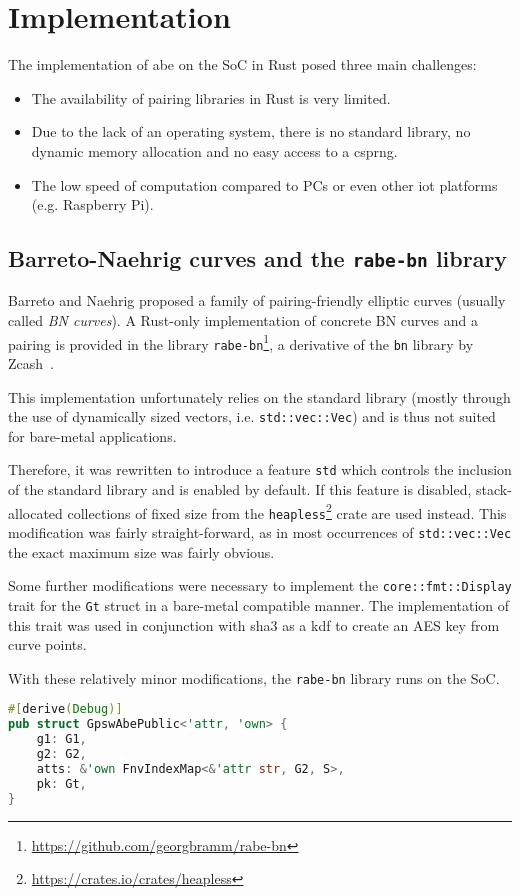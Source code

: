 \chapter{Implementation}

The implementation of \acrshort{abe} on the SoC in Rust posed three main challenges:
\begin{itemize}
    \item The availability of pairing libraries in Rust is very limited.
    \item Due to the lack of an operating system, there is no standard library, no dynamic memory allocation and no easy access to a \acrshort{csprng}.
    \item The low speed of computation compared to PCs or even other \gls{iot} platforms (e.g. Raspberry Pi).
\end{itemize}

\section{Barreto-Naehrig curves and the \texttt{rabe-bn} library}

Barreto and Naehrig \cite{barreto_pairing-friendly_2006} proposed a family of pairing-friendly elliptic curves (usually called \emph{BN curves}).
A Rust-only implementation of concrete BN curves and a pairing is provided in the library \texttt{rabe-bn}\footnote{\url{https://github.com/georgbramm/rabe-bn}}, a derivative of the \texttt{bn} library by Zcash~\cite{bowe_bn_2016}.

This implementation unfortunately relies on the standard library (mostly through the use of dynamically sized vectors, i.e. \texttt{std::vec::Vec}) and is thus not suited for bare-metal applications.

Therefore, it was rewritten to introduce a feature \texttt{std} which controls the inclusion of the standard library and is enabled by default.
If this feature is disabled, stack-allocated collections of fixed size from the \texttt{heapless}\footnote{\url{https://crates.io/crates/heapless}} crate are used instead.
This modification was fairly straight-forward, as in most occurrences of \texttt{std::vec::Vec} the exact maximum size was fairly obvious. %

Some further modifications were necessary to implement the \texttt{core::fmt::Display} trait for the \texttt{Gt} struct in a bare-metal compatible manner.
The implementation of this trait was used in conjunction with \acrshort{sha3} as a \gls{kdf} to create an AES key from curve points.

With these relatively minor modifications, the \texttt{rabe-bn} library runs on the SoC.

\newpage

\begin{lstlisting}[language=Rust]
#[derive(Debug)]
pub struct GpswAbePublic<'attr, 'own> {
    g1: G1,
    g2: G2,
    atts: &'own FnvIndexMap<&'attr str, G2, S>,
    pk: Gt,
}

\end{lstlisting}